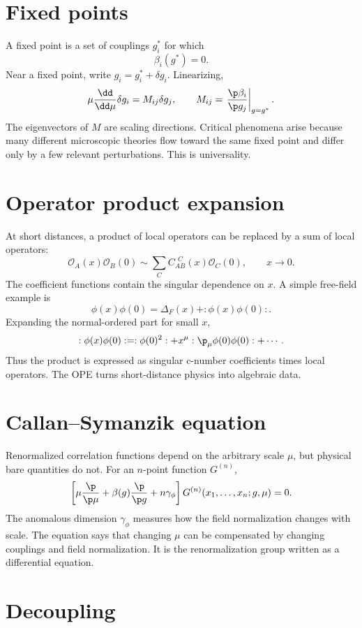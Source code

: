 \section{Fixed points}

A fixed point is a set of couplings \(g_i^*\) for which
\[
  \beta_i(g^*)=0.
\]
Near a fixed point, write \(g_i=g_i^*+\delta g_i\).  Linearizing,
\[
  \mu\frac{\dd}{\dd\mu}\delta g_i
  =
  M_{ij}\delta g_j,
  \qquad
  M_{ij}=\left.\frac{\p\beta_i}{\p g_j}\right|_{g=g^*}.
\]
The eigenvectors of \(M\) are scaling directions.  Critical phenomena arise because many different microscopic theories flow toward the same fixed point and differ only by a few relevant perturbations.  This is universality.

\section{Operator product expansion}

At short distances, a product of local operators can be replaced by a sum of local operators:
\[
  \mathcal O_A(x)\mathcal O_B(0)
  \sim
  \sum_C C_{AB}^{\ \ C}(x)\mathcal O_C(0),
  \qquad x\to0.
\]
The coefficient functions contain the singular dependence on \(x\).  A simple free-field example is
\[
  \phi(x)\phi(0)
  =
  \Delta_F(x)+:\phi(x)\phi(0):.
\]
Expanding the normal-ordered part for small \(x\),
\[
  :\phi(x)\phi(0):
  =
  :\phi(0)^2:
  +x^\mu:\p_\mu\phi(0)\phi(0):+\cdots.
\]
Thus the product is expressed as singular c-number coefficients times local operators.  The OPE turns short-distance physics into algebraic data.

\section{Callan--Symanzik equation}

Renormalized correlation functions depend on the arbitrary scale \(\mu\), but physical bare quantities do not.  For an \(n\)-point function \(G^{(n)}\),
\[
  \left[
  \mu\frac{\p}{\p\mu}
  +\beta(g)\frac{\p}{\p g}
  +n\gamma_\phi
  \right]G^{(n)}(x_1,\ldots,x_n;g,\mu)=0.
\]
The anomalous dimension \(\gamma_\phi\) measures how the field normalization changes with scale.  The equation says that changing \(\mu\) can be compensated by changing couplings and field normalization.  It is the renormalization group written as a differential equation.

\section{Decoupling}

